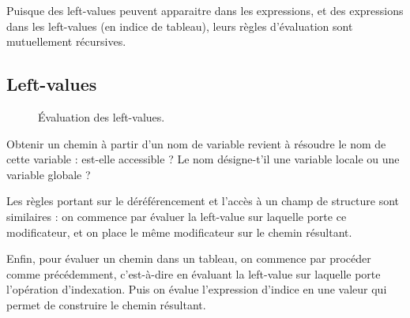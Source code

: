 Puisque des left-values peuvent apparaitre dans les expressions, et des
expressions dans les left-values (en indice de tableau), leurs règles
d'évaluation sont mutuellement récursives.

\subsection*{Left-values}

\begin{figure}

  \centering


  \caption{Évaluation des left-values.}
  \label{fig:eval-lv}
\end{figure}

Obtenir un chemin à partir d'un nom de variable revient à résoudre le nom de
cette variable : est-elle accessible ? Le nom désigne-t'il une variable locale
ou une variable globale ?

\begin{mathpar}
\end{mathpar}

Les règles portant sur le déréférencement et l'accès à un champ de structure
sont similaires : on commence par évaluer la left-value sur laquelle porte ce
modificateur, et on place le même modificateur sur le chemin résultant.

\begin{mathpar}

\end{mathpar}

Enfin, pour évaluer un chemin dans un tableau, on commence par procéder comme
précédemment, c'est-à-dire en évaluant la left-value sur laquelle porte
l'opération d'indexation. Puis on évalue l'expression d'indice en une valeur qui
permet de construire le chemin résultant.

